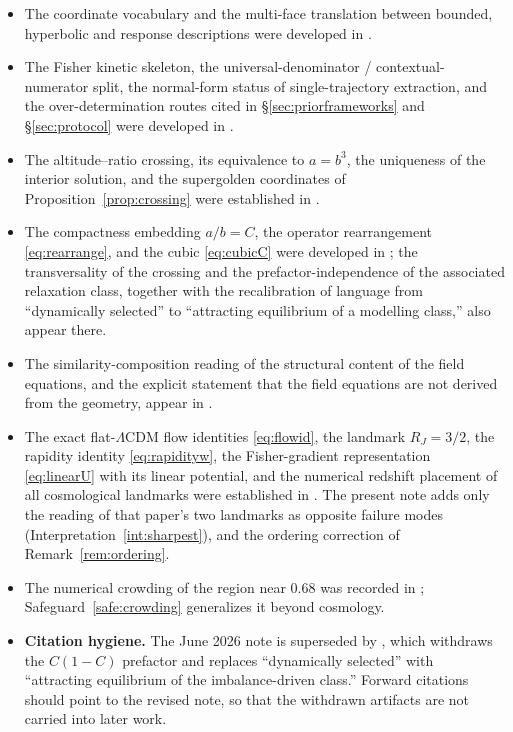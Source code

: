 \documentclass[11pt,a4paper]{article}
\theoremstyle{definition}
\theoremstyle{plain}
\theoremstyle{remark}
\begin{document}
\begin{itemize}[leftmargin=*]
\item The coordinate vocabulary and the multi-face translation between bounded,
hyperbolic and response descriptions were developed in
\cite{TwoFace}.

\item The Fisher kinetic skeleton, the universal-denominator /
contextual-numerator split, the normal-form status of single-trajectory
extraction, and the over-determination routes cited in
\S\ref{sec:priorframeworks} and \S\ref{sec:protocol} were developed in
\cite{EffPot}.

\item The altitude--ratio crossing, its equivalence to $a=b^{3}$, the
uniqueness of the interior solution, and the supergolden coordinates of
Proposition~\ref{prop:crossing} were established in
\cite{IntrinsicCubic}.

\item The compactness embedding $a/b=C$, the operator rearrangement
\eqref{eq:rearrange}, and the cubic \eqref{eq:cubicC} were developed in
\cite{CubicThreshold}; the transversality of the crossing and the
prefactor-independence of the associated relaxation class, together with the
recalibration of language from ``dynamically selected'' to ``attracting
equilibrium of a modelling class,'' also appear
there.

\item The similarity-composition reading of the structural content of the field
equations, and the explicit statement that the field equations are not derived
from the geometry, appear in
\cite{ReverseThales}.

\item The exact flat-$\Lambda$CDM flow identities \eqref{eq:flowid}, the
landmark $R_{J}=3/2$, the rapidity identity \eqref{eq:rapidityw}, the
Fisher-gradient representation \eqref{eq:linearU} with its linear potential, and
the numerical redshift placement of all cosmological landmarks were established
in \cite{PartitionFlow}. The present note adds only the reading of that paper's
two landmarks as opposite failure modes
(Interpretation~\ref{int:sharpest}), and the ordering correction of
Remark~\ref{rem:ordering}.

\item The numerical crowding of the region near $0.68$ was recorded in
\cite{NormNulls}; Safeguard~\ref{safe:crowding} generalizes it beyond
cosmology.

\item \textbf{Citation hygiene.} The June 2026 note \cite{DynSelSuperseded} is
superseded by \cite{AltitudeRelax}, which withdraws the $C(1-C)$ prefactor and
replaces ``dynamically selected'' with ``attracting equilibrium of the
imbalance-driven class.'' Forward citations should point to the revised note, so
that the withdrawn artifacts are not carried into later
work.


\end{itemize}
\end{document}
